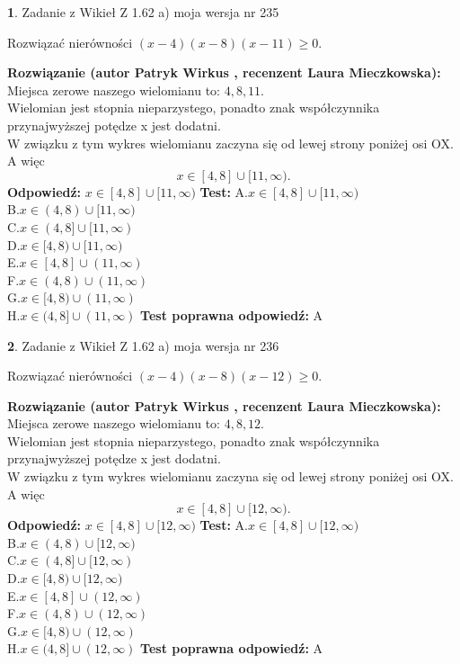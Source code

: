\documentclass[12pt, a4paper]{article}
\theoremstyle{definition} %
\newtheorem{zad}{}
\newcommand{\zadStart}[1]{\begin{zad}#1\newline}
\newcommand{\zadStop}{\end{zad}}
\newcommand{\rozwStart}[2]{\noindent \textbf{Rozwiązanie (autor #1 , recenzent #2): }\newline}
\newcommand{\rozwStop}{\newline}
\newcommand{\odpStart}{\noindent \textbf{Odpowiedź:}\newline}
\newcommand{\odpStop}{\newline}
\newcommand{\testStart}{\noindent \textbf{Test:}\newline}
\newcommand{\testStop}{\newline}
\newcommand{\kluczStart}{\noindent \textbf{Test poprawna odpowiedź:}\newline}
\newcommand{\kluczStop}{\newline}
\begin{document}
\zadStart{Zadanie z Wikieł Z 1.62 a) moja wersja nr 235}

Rozwiązać nierówności $(x-4)(x-8)(x-11)\ge0$.
\zadStop
\rozwStart{Patryk Wirkus}{Laura Mieczkowska}
Miejsca zerowe naszego wielomianu to: $4, 8, 11$.\\
Wielomian jest stopnia nieparzystego, ponadto znak współczynnika przy\linebreak najwyższej potędze x jest dodatni.\\ W związku z tym wykres wielomianu zaczyna się od lewej strony poniżej osi OX. A więc $$x \in [4,8] \cup [11,\infty).$$
\rozwStop
\odpStart
$x \in [4,8] \cup [11,\infty)$
\odpStop
\testStart
A.$x \in [4,8] \cup [11,\infty)$\\
B.$x \in (4,8) \cup [11,\infty)$\\
C.$x \in (4,8] \cup [11,\infty)$\\
D.$x \in [4,8) \cup [11,\infty)$\\
E.$x \in [4,8] \cup (11,\infty)$\\
F.$x \in (4,8) \cup (11,\infty)$\\
G.$x \in [4,8) \cup (11,\infty)$\\
H.$x \in (4,8] \cup (11,\infty)$
\testStop
\kluczStart
A
\kluczStop



\zadStart{Zadanie z Wikieł Z 1.62 a) moja wersja nr 236}

Rozwiązać nierówności $(x-4)(x-8)(x-12)\ge0$.
\zadStop
\rozwStart{Patryk Wirkus}{Laura Mieczkowska}
Miejsca zerowe naszego wielomianu to: $4, 8, 12$.\\
Wielomian jest stopnia nieparzystego, ponadto znak współczynnika przy\linebreak najwyższej potędze x jest dodatni.\\ W związku z tym wykres wielomianu zaczyna się od lewej strony poniżej osi OX. A więc $$x \in [4,8] \cup [12,\infty).$$
\rozwStop
\odpStart
$x \in [4,8] \cup [12,\infty)$
\odpStop
\testStart
A.$x \in [4,8] \cup [12,\infty)$\\
B.$x \in (4,8) \cup [12,\infty)$\\
C.$x \in (4,8] \cup [12,\infty)$\\
D.$x \in [4,8) \cup [12,\infty)$\\
E.$x \in [4,8] \cup (12,\infty)$\\
F.$x \in (4,8) \cup (12,\infty)$\\
G.$x \in [4,8) \cup (12,\infty)$\\
H.$x \in (4,8] \cup (12,\infty)$
\testStop
\kluczStart
A
\kluczStop
\end{document}
